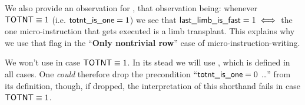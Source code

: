 \saNote{} \label{mmu: instructions: ram to ram sans padding: fast_last_limb is useful for totnt = 1}
We also provide an observation for \locFastLastLimb{}, that observation being: whenever $\textsf{TOTNT} \equiv 1$ (i.e. $\textsf{totnt\_is\_one} = 1$) we see that $\textsf{last\_limb\_is\_fast} = 1 \iff$ the one micro-instruction that gets executed is a limb transplant. This explains why we use that flag in the ``\textbf{Only nontrivial row}'' case of micro-instruction-writing.

\saNote{} We won't use \locFastFirstLimb{} in case $\textsf{TOTNT} \equiv 1$. In its stead we will use \locFastLastLimb{}, which is defined in all cases.
One \emph{could} therefore drop the precondition ``\If $\textsf{totnt\_is\_one} = 0$ \Then \dots'' from its definition, though, if dropped, the interpretation of this shorthand fails in case $\textsf{TOTNT} \equiv 1$.
